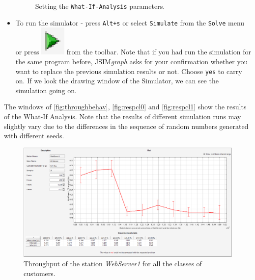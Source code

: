 \begin{itemize}
\begin{figure}[htb]
\begin{center}
    \end{center}
    \caption{Setting the \texttt{What-If-Analysis} parameters.}
    \label{fig:wiaparam}
\end{figure}
\item To run the simulator - press \texttt{Alt+s} or select
\texttt{Simulate} from the \texttt{Solve} menu or press
\includegraphics[scale=.5]{img/jsimg/play}
from the toolbar. Note that if you had run the simulation for the
same program before, JSIM\emph{graph} asks for your confirmation
whether you want to replace the previous simulation results or
not. Choose \texttt{yes} to carry on. If we look the drawing
window of the Simulator, we can see the simulation going on.
\end{itemize}
The windows of \autoref{fig:throughbehav}, \autoref{fig:respcl0} and
\autoref{fig:respcl1} show the results of the What-If Analysis. Note
that the results of different simulation runs may slightly vary
due to the differences in the sequence of random numbers generated
with different seeds.
\begin{figure}[htb]
    \begin{center}
        \includegraphics[scale=.36]{img/jsimg/EX2Throughput.eps}
    \end{center}
    \caption{Throughput of the station \emph{WebServer1} for all the classes of customers.}
    \label{fig:throughbehav}
\end{figure}


